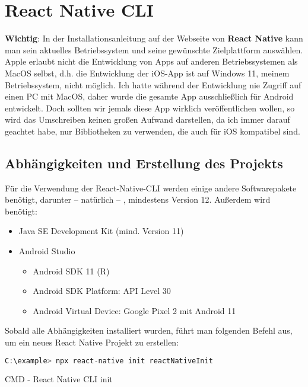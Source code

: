 \section{React Native CLI}
\textbf{Wichtig}: In der Installationsanleitung auf der Webseite von \textbf{React Native} kann man sein
aktuelles Betriebssystem und seine gewünschte Zielplattform auswählen. Apple erlaubt nicht die
Entwicklung von Apps auf anderen Betriebssystemen als MacOS selbst, d.h. die Entwicklung der iOS-App
ist auf Windows 11, meinem Betriebssystem, nicht möglich. Ich hatte während der Entwicklung nie
Zugriff auf einen PC mit MacOS, daher wurde die gesamte App ausschließlich für Android entwickelt.
Doch sollten wir jemals diese App wirklich veröffentlichen wollen, so wird das Umschreiben keinen
großen Aufwand darstellen, da ich immer darauf geachtet habe, nur Bibliotheken zu verwenden, die
auch für iOS kompatibel sind.

\subsection{Abhängigkeiten und Erstellung des Projekts}
Für die Verwendung der React-Native-CLI werden einige andere Softwarepakete benötigt, darunter --
natürlich -- \underline{}, mindestens Version 12. Außerdem wird benötigt:

\begin{itemize}
  \item Java SE Development Kit (mind. Version 11)
  \item Android Studio
  \begin{itemize}
    \item Android SDK 11 (R)
    \item Android SDK Platform: API Level 30
    \item Android Virtual Device: Google Pixel 2 mit Android 11
  \end{itemize}
\end{itemize}

Sobald alle Abhängigkeiten installiert wurden, führt man folgenden Befehl aus, um ein neues React
Native Projekt zu erstellen:

\begin{code}[htp]
\begin{lstlisting}[firstnumber=1,language=JavaScript, style=CMD]
C:\example> npx react-native init reactNativeInit
\end{lstlisting}
\caption{CMD - React Native CLI init}
\end{code}

